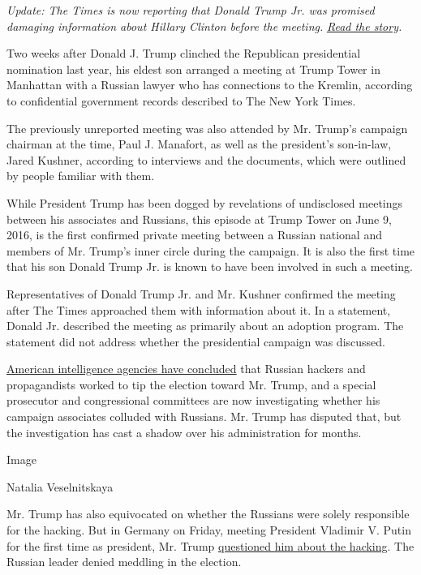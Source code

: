 \emph{Update: The Times is now reporting that Donald Trump Jr. was
promised damaging information about Hillary Clinton before the meeting.}
\href{https://www.nytimes3xbfgragh.onion/2017/07/09/us/politics/trump-russia-kushner-manafort.html?hp\&action=click\&pgtype=Homepage\&clickSource=story-heading\&module=first-column-region\&region=top-news\&WT.nav=top-news}{\emph{Read
the story}}\emph{.}

Two weeks after Donald J. Trump clinched the Republican presidential
nomination last year, his eldest son arranged a meeting at Trump Tower
in Manhattan with a Russian lawyer who has connections to the Kremlin,
according to confidential government records described to The New York
Times.

The previously unreported meeting was also attended by Mr. Trump's
campaign chairman at the time, Paul J. Manafort, as well as the
president's son-in-law, Jared Kushner, according to interviews and the
documents, which were outlined by people familiar with them.

While President Trump has been dogged by revelations of undisclosed
meetings between his associates and Russians, this episode at Trump
Tower on June 9, 2016, is the first confirmed private meeting between a
Russian national and members of Mr. Trump's inner circle during the
campaign. It is also the first time that his son Donald Trump Jr. is
known to have been involved in such a meeting.

Representatives of Donald Trump Jr. and Mr. Kushner confirmed the
meeting after The Times approached them with information about it. In a
statement, Donald Jr. described the meeting as primarily about an
adoption program. The statement did not address whether the presidential
campaign was discussed.

\href{https://www.nytimes3xbfgragh.onion/2017/01/06/us/politics/russia-hack-report.html}{American
intelligence agencies have concluded} that Russian hackers and
propagandists worked to tip the election toward Mr. Trump, and a special
prosecutor and congressional committees are now investigating whether
his campaign associates colluded with Russians. Mr. Trump has disputed
that, but the investigation has cast a shadow over his administration
for months.

Image

Natalia Veselnitskaya

Mr. Trump has also equivocated on whether the Russians were solely
responsible for the hacking. But in Germany on Friday, meeting President
Vladimir V. Putin for the first time as president, Mr. Trump
\href{https://www.nytimes3xbfgragh.onion/2017/07/07/world/europe/trump-putin-g20.html}{questioned
him about the hacking}. The Russian leader denied meddling in the
election.

